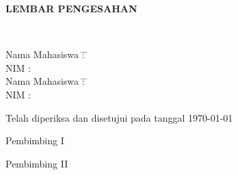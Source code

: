 \newpage
\thispagestyle{empty}
\begin{center}
\begin{doublespace}
\textbf{\large \MakeUppercase{lembar pengesahan}}\\ [2cm]
\textbf{\large\MakeUppercase {\judul}}
\end{doublespace}
\textbf{{\penulissatu}}
\textbf{\nimsatu}
\textbf{{\penulissatu}}
\textbf{\nimdua}\\
\text{\nimdua}
\end{center}
\vfill
\begin{tabbing}
Nama Mahasiswa \hspace{1.5cm} \= : \= \penulissatu \\[2em]
NIM \> : \> \nimsatu \\[2cm]
Nama Mahasiswa \hspace{1.5cm} \= : \= \penulisdua \\[1em]
NIM \> : \> \nimdua
\end{tabbing}

\vspace{2cm}
\noindent Telah diperiksa dan disetujui pada tanggal \today \\[3em]

\begin{minipage}{0.35\textwidth}
Pembimbing I\\[2cm]
\pembimbingsatu
\end{minipage}
\hfill
\begin{minipage}{0.3\textwidth}
Pembimbing II\\[2cm]
\pembimbingdua
\end{minipage}

